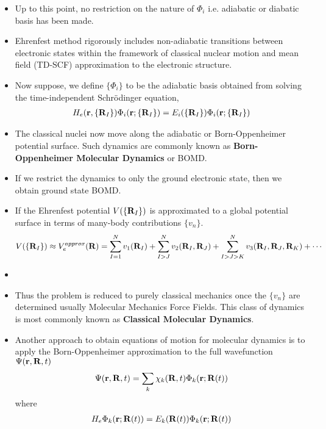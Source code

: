 \documentclass[slidestop,mathserif,compress,xcolor=svgnames]{beamer}
\begin{document}
\begin{frame}[allowframebreaks]
\begin{itemize}
\item Up to this point, no restriction on the nature of $\Phi_i$ i.e. adiabatic or diabatic basis has been made. 
\item Ehrenfest method rigorously includes non-adiabatic transitions between electronic states within the framework of classical nuclear motion and mean field (TD-SCF) approximation to the electronic structure.
\item Now suppose, we define $\{\Phi_i\}$ to be the adiabatic basis obtained from solving the time-independent Schr\"{o}dinger equation,
\begin{align*}
H_e({\bf r},\{{\bf R}_I\})\Phi_i({\bf r};\{{\bf R}_I\}) = E_i(\{{\bf R}_I\})\Phi_i({\bf r};\{{\bf R}_I\})
\end{align*}
\item The classical nuclei now move along the adiabatic or Born-Oppenheimer potential surface. Such dynamics are commonly known as \textbf{Born-Oppenheimer Molecular Dynamics} or BOMD.
\item If we restrict the dynamics to only the ground electronic state, then we obtain ground state BOMD.
\item If the Ehrenfest potential $V(\{{\bf R}_I\})$ is approximated to a global potential surface in terms of many-body contributions $\{v_n\}$.
\begin{align*}
V(\{{\bf R}_I\}) \approx V^{approx}_e({\bf R}) = \sum^{N}_{I=1}v_1({\bf R}_I) + \sum^N_{I>J}v_2({\bf R}_I,{\bf R}_J) +\sum^N_{I>J>K}v_3({\bf R}_I,{\bf R}_J,{\bf R}_K) + \cdots
\end{align*}
\item[] 
\item Thus the problem is reduced to purely classical mechanics once the $\{v_n\}$ are determined usually Molecular Mechanics Force Fields. This class of dynamics is most commonly known as {\bf Classical Molecular Dynamics}.
\item Another approach to obtain equations of motion for  molecular dynamics is to apply the Born-Oppenheimer approximation to the full wavefunction $\Psi({\bf r},{\bf R},t)$
\begin{align*}
\Psi({\bf r},{\bf R},t) = \sum_k \chi_k({\bf R},t)\Phi_k({\bf r};{\bf R}(t))
\end{align*}
where
\begin{align*}
H_e\Phi_k({\bf r};{\bf R}(t)) = E_k({\bf R}(t))\Phi_k({\bf r};{\bf R}(t))

\end{align*}
\end{itemize}
\end{frame}
\end{document}
